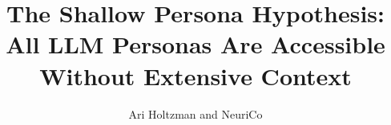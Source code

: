\documentclass{article}
\title{The Shallow Persona Hypothesis: All LLM Personas Are Accessible Without Extensive Context}
\author{Ari Holtzman and NeuriCo}
\begin{document}
\maketitle

\begin{abstract}

\end{abstract}











\appendix

\end{document}
